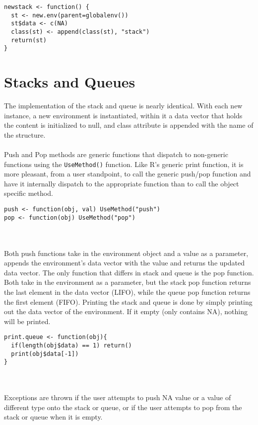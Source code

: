 \documentclass{article}
\begin{document}
\begin{lstlisting}
newstack <- function() {
  st <- new.env(parent=globalenv())  
  st$data <- c(NA)
  class(st) <- append(class(st), "stack")
  return(st)
}
\end{lstlisting}


\section{Stacks and Queues}

The implementation of the stack and queue is nearly identical. With each new instance, a new environment is instantiated, within it a data vector that holds the content is initialized to null, and class attribute is appended with the name of the structure.
\\\\ Push and Pop methods are generic functions that dispatch to non-generic functions using the \texttt{UseMethod()} function. Like R’s generic print function, it is more pleasant, from a user standpoint, to call the generic push/pop function and have it internally dispatch to the appropriate function than to call the object specific method.

\begin{lstlisting}
push <- function(obj, val) UseMethod("push") 
pop <- function(obj) UseMethod("pop") 
\end{lstlisting}
\\\\ Both push functions take in the environment object and a value as a parameter, appends the environment’s data vector with the value and returns the updated data vector. The only function that differs in stack and queue is the pop function. Both take in the environment as a parameter, but the stack pop function returns the last element in the data vector (LIFO), while the queue pop function returns the first element (FIFO). Printing the stack and queue is done by simply printing out the data vector of the environment. If it empty (only contains NA), nothing will be printed.

\begin{lstlisting}
print.queue <- function(obj){
  if(length(obj$data) == 1) return()
  print(obj$data[-1])
}
\end{lstlisting}
\\\\Exceptions are thrown if the user attempts to push NA value or a value of different type onto the stack or queue, or if the user attempts to pop from the stack or queue when it is empty.
\end{document}
